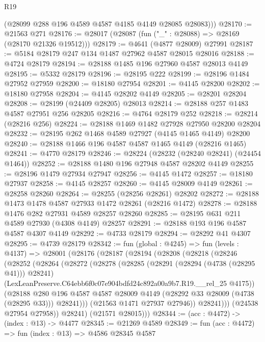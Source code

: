 \begin{lexlean}{R19}
\begin{coremodule}
        (@28099 @288 @196 @4589 @4587 @4185 @4149 @28085 @28083)))
@28170 := @21563 @271
@28176 := @28017 (@28087 (fun ("_" : @28088) => @28169 (@28170 @21326 @19512)))
@28179 := @4641 (@4877 @28009) @27991
@28187 := @5184 @28179 @247 @134 @1487 @27962 @4587 @28015 @28016
@28188 := @4724 @28179
@28194 := @28188 @1485 @196 @27960 @4587 @28013 @4149
@28195 := @5332 @28179
@28196 := @28195 @222
@28199 := @28196 @1484 @27952 @27959
@28200 := @18180 @27954
@28201 := @4145 @28200
@28202 := @18180 @27958
@28204 := @4145 @28202 @4149
@28205 := @28201 @28204
@28208 := @28199 (@24409 @28205) @28013
@28214 := @28188 @257 @1483 @4587 @27951 @256 @28205
@28216 := @4764 @28179 @252
@28218 := @28214 (@28216 @256)
@28224 := @28188 @1469 @1482 @27928 @27950 @28200 @28204
@28232 := @28195 @262 @1468 @4589 @27927 (@4145 @1465 @4149) @28200
@28240 := @28188 @1466 @196 @4587 @4587 @1465 @4149 (@28216 @1465)
@28241 := @4770 @28179
@28246 := @28224 (@28232 (@28240 @28241) (@24454 @1464))
@28252 := @28188 @1480 @196 @27948 @4587 @28202 @4149
@28255 := @28196 @1479 @27934 @27947
@28256 := @4145 @1472
@28257 := @18180 @27937
@28258 := @4145 @28257
@28260 := @4145 @28009 @4149
@28261 := @28258 @28260
@28264 := @28255 (@28256 @28261) @28202
@28272 := @28188 @1473 @1478 @4587 @27933 @1472 @28261 (@28216 @1472)
@28278 := @28188 @1476 @282 @27931 @4589 @28257 @28260
@28285 := @28195 @631 @211 @4589 @27930 (@4308 @4149) @28257
@28291 := @28188 @193 @196 @4587 @4587 @4307 @4149
@28292 := @4733 @28179
@28294 := @28292 @41 @4307
@28295 := @4739 @28179
@28342 := fun (global : @4245) =>
  fun (levels : @4137) =>
  @28001
    (@28176
      (@28187
        (@28194
          (@28208
            (@28218
              (@28246
                (@28252
                  (@28264
                    (@28272
                      (@28278
                        (@28285
                          (@28291 (@28294 (@4738 (@28295 @41))) @28241)
                          (LexLeanPreserve.C64ebb6f0c07e904bdfd24c892a00a9b7.R19.__rel_25 @4175))
                        (@28188
                          @280
                          @196
                          @4587
                          @4587
                          @28009
                          @4149
                          (@28292 @33 @28009 (@4738 (@28295 @33)))
                          @28241)))
                    (@21563 @1471 @27937 @27946))
                  @28241)))
            (@24538 @27954 @27958))
          @28241)
        (@21571 @28015)))
@28344 := (acc : @4472) -> (index : @13) -> @4477
@28345 := @21269 @4589
@28349 := fun (acc : @4472) => fun (index : @13) => @4586 @28345 @4587

\end{coremodule}
\end{lexlean}
